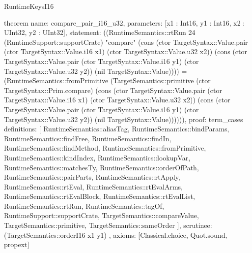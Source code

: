 \begin{lexlean}{RuntimeKeysI16}
\begin{semanticmodule}
theorem{
  name: compare_pair_i16_u32,
  parameters: [x1 : Int16, y1 : Int16, x2 : UInt32, y2 : UInt32],
  statement: ((RuntimeSemantics::rtRun 24 (RuntimeSupport::supportCrate) "compare" (cons (ctor TargetSyntax::Value.pair (ctor TargetSyntax::Value.i16 x1) (ctor TargetSyntax::Value.u32 x2)) (cons (ctor TargetSyntax::Value.pair (ctor TargetSyntax::Value.i16 y1) (ctor TargetSyntax::Value.u32 y2)) (nil TargetSyntax::Value)))) = (RuntimeSemantics::fromPrimitive (TargetSemantics::primitive (ctor TargetSyntax::Prim.compare) (cons (ctor TargetSyntax::Value.pair (ctor TargetSyntax::Value.i16 x1) (ctor TargetSyntax::Value.u32 x2)) (cons (ctor TargetSyntax::Value.pair (ctor TargetSyntax::Value.i16 y1) (ctor TargetSyntax::Value.u32 y2)) (nil TargetSyntax::Value)))))),
  proof: term_cases{
    definitions: [
      RuntimeSemantics::aliasTag,
      RuntimeSemantics::bindParams,
      RuntimeSemantics::findFree,
      RuntimeSemantics::findIn,
      RuntimeSemantics::findMethod,
      RuntimeSemantics::fromPrimitive,
      RuntimeSemantics::kindIndex,
      RuntimeSemantics::lookupVar,
      RuntimeSemantics::matchesTy,
      RuntimeSemantics::orderOfPath,
      RuntimeSemantics::pairParts,
      RuntimeSemantics::rtApply,
      RuntimeSemantics::rtEval,
      RuntimeSemantics::rtEvalArms,
      RuntimeSemantics::rtEvalBlock,
      RuntimeSemantics::rtEvalList,
      RuntimeSemantics::rtRun,
      RuntimeSemantics::tagOf,
      RuntimeSupport::supportCrate,
      TargetSemantics::compareValue,
      TargetSemantics::primitive,
      TargetSemantics::sameOrder
    ],
    scrutinee: (TargetSemantics::orderI16 x1 y1)
  },
  axioms: [Classical.choice, Quot.sound, propext]
}


\end{semanticmodule}
\end{lexlean}
